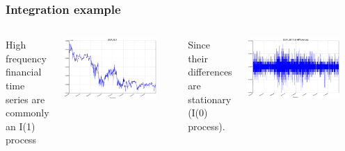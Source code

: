 \documentclass{beamer}
\begin{document}
\appendix




\begin{frame}
\frametitle{Integration example}
\begin{columns}
\column[t]{5cm}
High frequency financial time series are commonly an I(1) process 
\begin{center}
\includegraphics[width=0.85\textwidth]{img/EURUSD}
\end{center}
\column[t]{5cm}
Since their differences are stationary (I(0) process).
\newline
\begin{center}
\includegraphics[width=0.85\textwidth]{img/DEURUSD}
\end{center}
\end{columns}
\end{frame}
\end{document}
